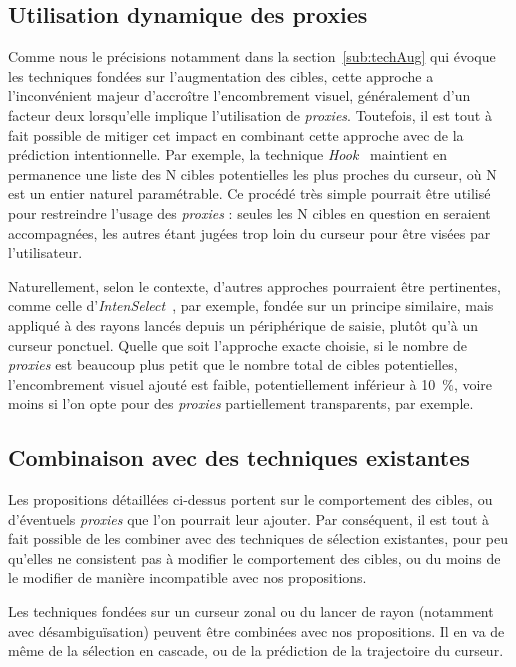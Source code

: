 	
	\subsection{Utilisation dynamique des proxies}
	\label{sub:dynamicProxies}
	Comme nous le précisions notamment dans la section~\ref{sub:techAug} qui évoque les techniques fondées sur l'augmentation des cibles, cette approche a l'inconvénient majeur d'accroître l'encombrement visuel, généralement d'un facteur deux lorsqu'elle implique l'utilisation de \emph{proxies}. Toutefois, il est tout à fait possible de mitiger cet impact en combinant cette approche avec de la prédiction intentionnelle. Par exemple, la technique \emph{Hook}~\cite{ortega2013hook} maintient en permanence une liste des N cibles potentielles les plus proches du curseur, où N est un entier naturel paramétrable. Ce procédé très simple pourrait être utilisé pour restreindre l'usage des \emph{proxies} : seules les N cibles en question en seraient accompagnées, les autres étant jugées trop loin du curseur pour être visées par l'utilisateur.
	
	Naturellement, selon le contexte, d'autres approches pourraient être pertinentes, comme celle d'\emph{IntenSelect}~\cite{de2005intenselect}, par exemple, fondée sur un principe similaire, mais appliqué à des rayons lancés depuis un périphérique de saisie, plutôt qu'à un curseur ponctuel. Quelle que soit l'approche exacte choisie, si le nombre de \emph{proxies} est beaucoup plus petit que le nombre total de cibles potentielles, l'encombrement visuel ajouté est faible, potentiellement inférieur à 10~\%{}, voire moins si l'on opte pour des \emph{proxies} partiellement transparents, par exemple.

	\subsection{Combinaison avec des techniques existantes}
	Les propositions détaillées ci-dessus portent sur le comportement des cibles, ou d'éventuels \emph{proxies} que l'on pourrait leur ajouter. Par conséquent, il est tout à fait possible de les combiner avec des techniques de sélection existantes, pour peu qu'elles ne consistent pas à modifier le comportement des cibles, ou du moins de le modifier de manière incompatible avec nos propositions.
	
	Les techniques fondées sur un curseur zonal ou du lancer de rayon (notamment avec désambiguïsation) peuvent être combinées avec nos propositions. Il en va de même de la sélection en cascade, ou de la prédiction de la trajectoire du curseur.
	
